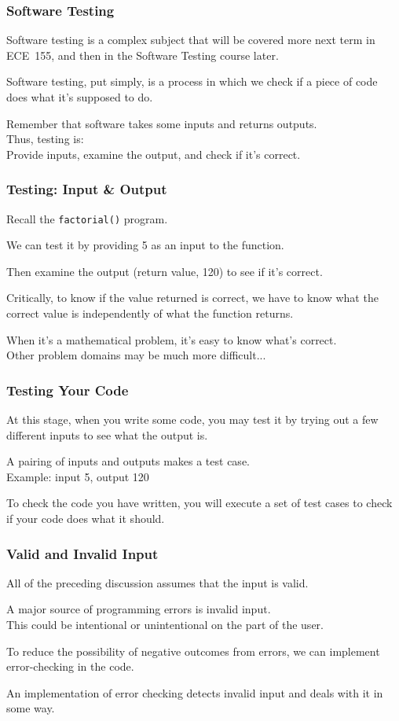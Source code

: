 \begin{frame}
\frametitle{Software Testing}
Software testing is a complex subject that will be covered more next term in ECE~155, and then in the Software Testing course later.

Software testing, put simply, is a process in which we check if a piece of code does what it's supposed to do.

Remember that software takes some inputs and returns outputs.\\
\quad Thus, testing is:\\
\quad \quad Provide inputs, examine the output, and check if it's correct.

\end{frame}

\begin{frame}
\frametitle{Testing: Input \& Output}
Recall the \texttt{factorial()} program.

We can test it by providing 5 as an input to the function.

Then examine the output (return value, 120) to see if it's correct.

Critically, to know if the value returned is correct, we have to know what the correct value is independently of what the function returns.

When it's a mathematical problem, it's easy to know what's correct.\\
\quad Other problem domains may be much more difficult...

\end{frame}

\begin{frame}
\frametitle{Testing Your Code}
At this stage, when you write some code, you may test it by trying out a few different inputs to see what the output is.

A pairing of inputs and outputs makes a \alert{test case}.\\
\quad Example: input 5, output 120

To check the code you have written, you will execute a set of test cases to check if your code does what it should. 

\end{frame}

\begin{frame}
\frametitle{Valid and Invalid Input}
All of the preceding discussion assumes that the input is valid.

A major source of programming errors is invalid input.\\
\quad This could be intentional or unintentional on the part of the user.

To reduce the possibility of negative outcomes from errors, we can implement \alert{error-checking} in the code.

An implementation of error checking detects invalid input and deals with it in some way.

\end{frame}

